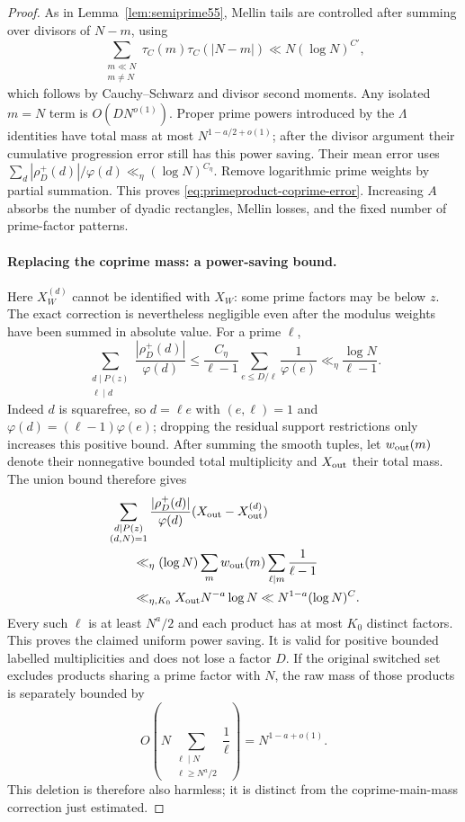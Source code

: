 \documentclass[11pt]{article}
\begin{document}
\begin{proof}
As in Lemma~\ref{lem:semiprime55}, Mellin tails are controlled
after summing over divisors of $N-m$, using
\[
 \sum_{\substack{m\ll N\\m\ne N}}
      \tau_C(m)\tau_C(|N-m|)
        \ll N(\log N)^{C'},
\]
which follows by Cauchy--Schwarz and divisor second moments.
Any isolated $m=N$ term is $O(DN^{o(1)})$.
Proper prime powers introduced by the $\Lambda$ identities
have total mass at most $N^{1-a/2+o(1)}$; after the divisor
argument their cumulative progression error still has
this power saving. Their mean error uses
$\sum_d|\rho_D^+(d)|/\varphi(d)\ll_\eta(\log N)^{C_\eta}$.
Remove logarithmic prime weights by partial summation.
This proves \eqref{eq:primeproduct-coprime-error}.
Increasing $A$ absorbs the number of dyadic rectangles,
Mellin losses, and the fixed number of prime-factor patterns.

\paragraph{Replacing the coprime mass: a power-saving bound.}
Here $X_W^{(d)}$ cannot be identified with $X_W$:
some prime factors may be below $z$.
The exact correction is nevertheless negligible even after
the modulus weights have been summed in absolute value.
For a prime $\ell$,
\[
 \sum_{\substack{d\mid P(z)\\\ell\mid d}}
     \frac{|\rho_D^+(d)|}{\varphi(d)}
 \le \frac{C_\eta}{\ell-1}
          \sum_{e\le D/\ell}\frac1{\varphi(e)}
 \ll_\eta \frac{\log N}{\ell-1}.
\]
Indeed $d$ is squarefree, so $d=\ell e$ with $(e,\ell)=1$
and $\varphi(d)=(\ell-1)\varphi(e)$; dropping the residual
support restrictions only increases this positive bound.
After summing the smooth tuples, let $w_{\rm out}(m)$ denote
their nonnegative bounded total multiplicity and $X_{\rm out}$
their total mass. The union bound therefore gives
\begin{align*}
 &\sum_{\substack{d\mid P(z)\\(d,N)=1}}
    \frac{|\rho_D^+(d)|}{\varphi(d)}
                      (X_{\rm out}-X_{\rm out}^{(d)})\\
 &\qquad\ll_\eta
    (\log N)\sum_m w_{\rm out}(m)
          \sum_{\ell\mid m}\frac1{\ell-1}\\
 &\qquad\ll_{\eta,K_0}
    X_{\rm out}N^{-a}\log N
       \ll N^{1-a}(\log N)^{C}.
\end{align*}
Every such $\ell$ is at least $N^a/2$ and each product has at
most $K_0$ distinct factors. This proves the claimed uniform
power saving. It is valid for positive bounded labelled
multiplicities and does not lose a factor $D$.
If the original switched set excludes products sharing a prime
factor with $N$, the raw mass of those products is separately bounded by
\[
 O\left(N\sum_{\substack{\ell\mid N\\\ell\ge N^a/2}}\frac1\ell\right)
       =N^{1-a+o(1)}.
\]
This deletion is therefore also harmless; it is distinct from the
coprime-main-mass correction just estimated.


\end{proof}
\end{document}
